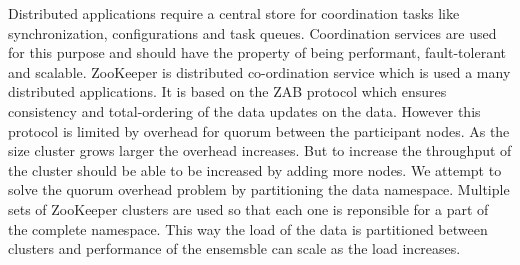 Distributed applications require a central store for coordination tasks like synchronization, configurations and task queues. Coordination services are used for this purpose and should have the property of being performant, fault-tolerant and scalable. ZooKeeper is distributed co-ordination service which is used a many distributed applications. It is based on the ZAB protocol which ensures consistency and total-ordering of the data updates on the data. However this protocol is limited by overhead for quorum between the participant nodes. As the size cluster grows larger the overhead increases. But to increase the throughput of the cluster should be able to be increased by adding more nodes. We attempt to solve the quorum overhead problem by partitioning the data namespace. Multiple sets of ZooKeeper clusters are used so that each one is reponsible for a part of the complete namespace.  This way the load of the data is partitioned between clusters and performance of the ensemsble can scale as the load increases.
